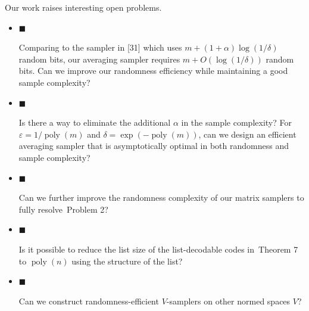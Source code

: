 Our work raises interesting open problems.\par


\begin{itemize}


\item[] 
$\blacksquare$ 


Comparing to the sampler in [31] which uses $m+(1+\alpha)\log(1/\delta)$ random bits, our averaging sampler requires $m+O(\log(1/\delta))$ random bits. Can we improve our randomness efficiency while maintaining a good sample complexity?\par





\item[] 
$\blacksquare$ 


Is there a way to eliminate the additional $\alpha$ in the sample complexity? For $\varepsilon=1/\operatorname*{poly}(m)$ and $\delta=\exp(-\operatorname*{poly}(m))$, can we design an efficient averaging sampler that is asymptotically optimal in both randomness and sample complexity?\par





\item[] 
$\blacksquare$ 


Can we further improve the randomness complexity of our matrix samplers to fully resolve Problem 2?\par





\item[] 
$\blacksquare$ 


Is it possible to reduce the list size of the list-decodable codes in Theorem 7 to $\operatorname*{poly}(n)$ using the structure of the list?\par





\item[] 
$\blacksquare$ 


Can we construct randomness-efficient $V$-samplers on other normed spaces $V$?\par





\end{itemize}





